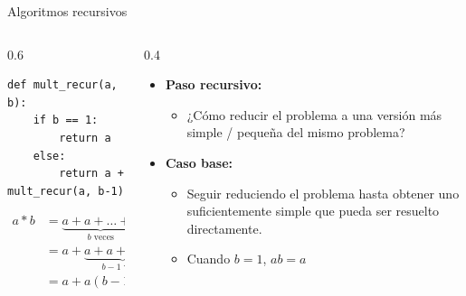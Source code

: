 \documentclass[mathserif]{beamer}
\begin{document}
\begin{frame}[fragile]{Algoritmos recursivos}
   \begin{columns}
        \begin{column}{0.6\textwidth}
\begin{lstlisting}
def mult_recur(a, b):
    if b == 1:
        return a
    else:
        return a + mult_recur(a, b-1)
\end{lstlisting}
\[\begin{split}
    a * b & = \underbrace{a + a + \ldots + a}_{\text{$b$ veces}}\\
    ~ & = a + \underbrace{a + a + \ldots + a}_{\text{$b-1$ veces}}\\
    ~ & = a + a(b-1) 
\end{split}\]
        \end{column}
        \begin{column}{0.4\textwidth}
        \begin{itemize}
            \item {\orange\bfseries Paso recursivo:}
            \begin{itemize}
                \item ¿Cómo reducir el problema a una versión {\blue más simple / pequeña} del mismo problema?
            \end{itemize}
            
            \item {\orange\bfseries Caso base:}
            \begin{itemize}
                \item Seguir reduciendo el problema hasta obtener uno {\blue suficientemente simple} que pueda ser resuelto directamente.
                \item Cuando $b = 1$, $ab=a$
            \end{itemize}
        \end{itemize}
        \end{column}
    \end{columns}
\end{frame}
\end{document}
